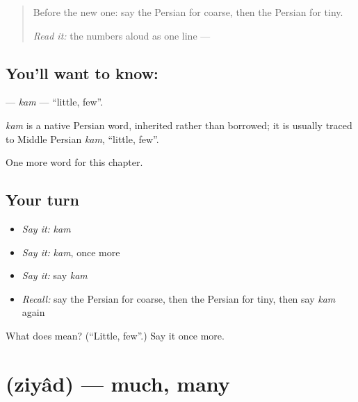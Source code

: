 \label{lesson:FA-C130-kam}



\begin{quote}
Before the new one: say the Persian for coarse, then the Persian for tiny.

\emph{Read it:} the numbers aloud as one line — \textbf{  }
\end{quote}

\subsection*{You'll want to know: }
\textbf{} — \emph{kam} — \textquotedblleft{}little, few\textquotedblright{}.

\begin{cousinweb}
\emph{kam} is a native Persian word, inherited rather than borrowed; it is usually traced to Middle Persian \emph{kam}, \textquotedblleft{}little, few\textquotedblright{}.
\end{cousinweb}

\begin{grammarlens}[title={What you've built}]
One more word for this chapter.
\end{grammarlens}

\subsection*{Your turn}
\begin{itemize}
\raggedright
  \item \emph{Say it:} \emph{kam}
  \item \emph{Say it:} \emph{kam}, once more
  \item \emph{Say it:} say \emph{kam}
  \item \emph{Recall:} say the Persian for coarse, then the Persian for tiny, then say \emph{kam} again
\end{itemize}

\begin{tcolorbox}[breakable,colback=teal!4,colframe=teal!35!black,title={Before you move on}]
What does  mean? (\textquotedblleft{}Little, few\textquotedblright{}.) Say it once more.
\end{tcolorbox}
\section[\texorpdfstring{\fa{زیاد} (ziyâd)}{زیاد (ziyâd)}]{ (ziyâd) — much, many}

